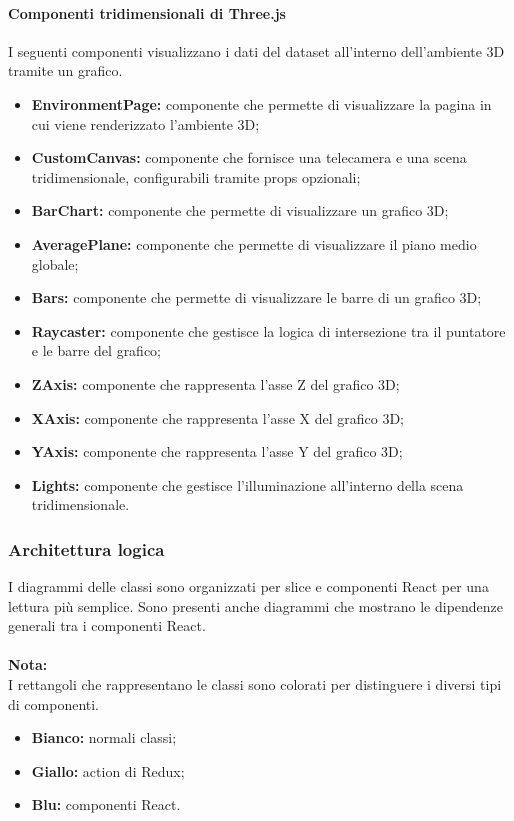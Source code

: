 \paragraph{Componenti tridimensionali di Three.js}
    I seguenti componenti visualizzano i dati del dataset all'interno dell'ambiente 3D tramite un grafico.
    \begin{itemize}
        \item \textbf{EnvironmentPage:} componente che permette di visualizzare la pagina in cui viene renderizzato l'ambiente 3D;
        \item \textbf{CustomCanvas:} componente che fornisce una telecamera e una scena tridimensionale, configurabili tramite props opzionali;
        \item \textbf{BarChart:} componente che permette di visualizzare un grafico 3D;
        \item \textbf{AveragePlane:} componente che permette di visualizzare il piano medio globale;
        \item \textbf{Bars:} componente che permette di visualizzare le barre di un grafico 3D;
        \item \textbf{Raycaster:} componente che gestisce la logica di intersezione tra il puntatore e le barre del grafico;
        \item \textbf{ZAxis:} componente che rappresenta l'asse Z del grafico 3D;
        \item \textbf{XAxis:} componente che rappresenta l'asse X del grafico 3D;
        \item \textbf{YAxis:} componente che rappresenta l'asse Y del grafico 3D;
        \item \textbf{Lights:} componente che gestisce l'illuminazione all'interno della scena tridimensionale.
    \end{itemize}

\pagebreak

\subsubsection{Architettura logica}
I diagrammi delle classi sono organizzati per slice e componenti React per una lettura più semplice. 
Sono presenti anche diagrammi che mostrano le dipendenze generali tra i componenti React.\\\\
\textbf{Nota:}\\
I rettangoli che rappresentano le classi sono colorati per distinguere i diversi tipi di componenti.
\begin{itemize}
    \item \textbf{Bianco:} normali classi;
    \item \textbf{Giallo:} action di Redux;
    \item \textbf{Blu:} componenti React.
\end{itemize}

